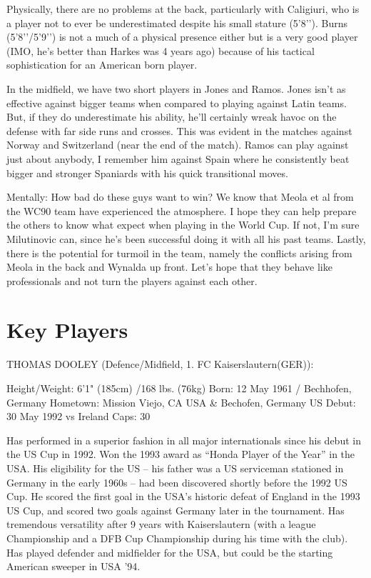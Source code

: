 Physically, there are no problems at the back, particularly with Caligiuri, who
is a player not to ever be underestimated despite his small stature (5’8’’). 
Burns (5’8’’/5’9’’) is not a much of a physical presence either but is a very 
good player (IMO, he's better than Harkes was 4 years ago) because of his 
tactical sophistication for an American born player.

In the midfield, we have two short players in Jones and Ramos. Jones isn't as 
effective against bigger teams when compared to playing against Latin teams. 
But, if they do underestimate his ability, he'll certainly wreak havoc on the 
defense with far side runs and crosses. This was evident in the matches against
Norway and Switzerland (near the end of the match). Ramos can play against just
about anybody, I remember him against Spain where he consistently beat bigger 
and stronger Spaniards with his quick transitional moves.

Mentally: How bad do these guys want to win? We know that Meola et al from the 
WC90 team have experienced the atmosphere. I hope they can help prepare the 
others to know what expect when playing in the World Cup. If not, I'm sure 
Milutinovic can, since he's been successful doing it with all his past teams. 
Lastly, there is the potential for turmoil in the team, namely the conflicts 
arising from Meola in the back and Wynalda up front. Let's hope that they 
behave like professionals and not turn the players against each other.

\section{Key Players}

THOMAS DOOLEY (Defence/Midfield, 1. FC Kaiserslautern(GER)):

Height/Weight: 6'1" (185cm) /168 lbs. (76kg)
Born: 12 May 1961 / Bechhofen, Germany
Hometown: Mission Viejo, CA USA \& Bechofen, Germany
US Debut: 30 May 1992 vs Ireland
Caps: 30

Has performed in a superior fashion in all major internationals since his debut
in the US Cup in 1992. Won the 1993 award as ``Honda Player of the Year'' in the 
USA. His eligibility for the US -- his father was a US serviceman stationed in 
Germany in the early 1960s -- had been discovered shortly before the 1992 US 
Cup. He scored the first goal in the USA's historic defeat of England in the 
1993 US Cup, and scored two goals against Germany later in the tournament. Has 
tremendous versatility after 9 years with Kaiserslautern (with a league 
Championship and a DFB Cup Championship during his time with the club). Has 
played defender and midfielder for the USA, but could be the starting American 
sweeper in USA '94.


